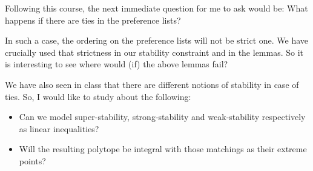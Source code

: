\documentclass[a4paper,UKenglish,cleveref, autoref]{lipics-v2019}
\theoremstyle{definition}
\begin{document}
Following this course, the next immediate question for me to ask would be: What happens if there are ties in the preference lists?

In such a case, the ordering on the preference lists will not be strict one. We have crucially used that strictness in our stability constraint and in the lemmas. So it is interesting to see where would (if) the above lemmas fail?

We have also seen in class that there are different notions of stability in case of ties. So, I would like to study about the following:
\begin{itemize}
    \item Can we model super-stability, strong-stability and weak-stability respectively as linear inequalities?
    \item Will the resulting polytope be integral with those matchings as their extreme points?
\end{itemize}
\end{document}
